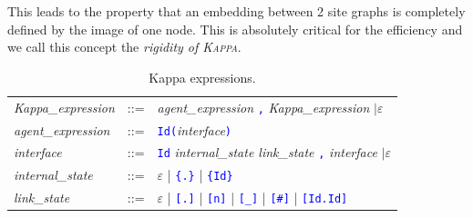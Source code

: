 \documentclass[11pt]{book}
\def\Kappa{\textsc{Kappa}}
\def\tcb#1{\textcolor{blue}{\ttt{#1}}}
\def\ttt#1{\texttt{#1}}
\begin{document}
This leads to the property that an embedding between 2 site graphs is
completely defined by the image of one node. This is absolutely
critical for the efficiency and we call this concept the
\emph{rigidity of \Kappa{}}.

\begin{table}[ht!]
  \centering
  \caption{Kappa expressions.}
  \begin{tabular}{@{} lcl @{}}
    \textit{Kappa\_expression} & ::= & \textit{agent\_expression} \tcb{,} \textit{Kappa\_expression} $\mid\varepsilon$ \\
    \textit{agent\_expression} & ::= &  \tcb{Id}\tcb{(}\textit{interface}\tcb{)} \\
    \textit{interface} &::=& \tcb{Id} \textit{internal\_state link\_state}  \tcb{,} \textit{interface} $\mid\varepsilon$ \\
    \textit{internal\_state} &::=& $\varepsilon$ | \tcb{\{.\}} | \tcb{\{Id\}} \\
    \textit{link\_state} &::=& $\varepsilon$ | \tcb{[.]} | \tcb{[n]} | \tcb{[\_]} | \tcb{[\#]}  | \tcb{[Id.Id]} \\
    \end{tabular}
  \label{tab:patterns}
\end{table}
\end{document}
